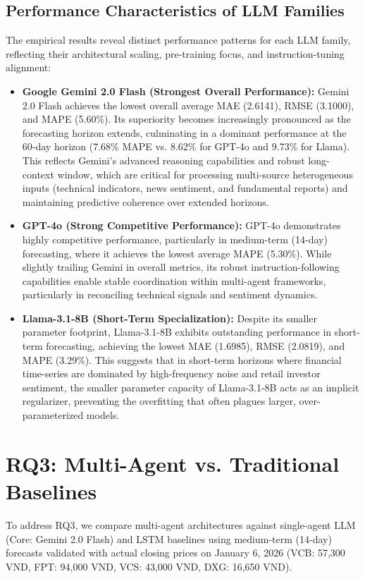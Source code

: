 \documentclass{ieeeaccess}
\begin{document}
\subsection{Performance Characteristics of LLM Families}
The empirical results reveal distinct performance patterns for each LLM family, reflecting their architectural scaling, pre-training focus, and instruction-tuning alignment:
\begin{itemize}
    \item \textbf{Google Gemini 2.0 Flash (Strongest Overall Performance):} Gemini 2.0 Flash achieves the lowest overall average MAE (2.6141), RMSE (3.1000), and MAPE (5.60\%). Its superiority becomes increasingly pronounced as the forecasting horizon extends, culminating in a dominant performance at the 60-day horizon (7.68\% MAPE vs. 8.62\% for GPT-4o and 9.73\% for Llama). This reflects Gemini's advanced reasoning capabilities and robust long-context window, which are critical for processing multi-source heterogeneous inputs (technical indicators, news sentiment, and fundamental reports) and maintaining predictive coherence over extended horizons.
    \item \textbf{GPT-4o (Strong Competitive Performance):} GPT-4o demonstrates highly competitive performance, particularly in medium-term (14-day) forecasting, where it achieves the lowest average MAPE (5.30\%). While slightly trailing Gemini in overall metrics, its robust instruction-following capabilities enable stable coordination within multi-agent frameworks, particularly in reconciling technical signals and sentiment dynamics.
    \item \textbf{Llama-3.1-8B (Short-Term Specialization):} Despite its smaller parameter footprint, Llama-3.1-8B exhibits outstanding performance in short-term forecasting, achieving the lowest MAE (1.6985), RMSE (2.0819), and MAPE (3.29\%). This suggests that in short-term horizons where financial time-series are dominated by high-frequency noise and retail investor sentiment, the smaller parameter capacity of Llama-3.1-8B acts as an implicit regularizer, preventing the overfitting that often plagues larger, over-parameterized models.
\end{itemize}

\clearpage
\section{RQ3: Multi-Agent vs. Traditional Baselines}
To address RQ3, we compare multi-agent architectures against single-agent LLM (Core: Gemini 2.0 Flash) and LSTM baselines using medium-term (14-day) forecasts validated with actual closing prices on January 6, 2026 (VCB: 57,300 VND, FPT: 94,000 VND, VCS: 43,000 VND, DXG: 16,650 VND).
\end{document}
